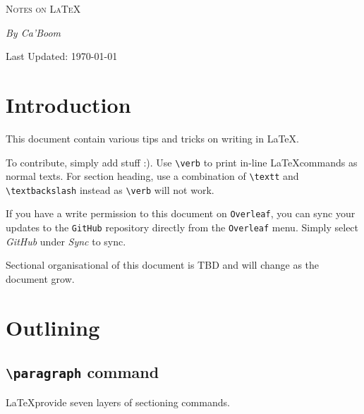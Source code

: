 \documentclass[a4paper,12pt]{article}
\begin{document}
\begin{titlepage}
    \centering
    \vspace*{3cm}  %
    {\scshape \Huge Notes on \LaTeX \par}
    \vspace{6cm}
    {\LARGE \itshape By Ca'Boom \par}
    \vspace{6cm}
    {\Large Last Updated: \today \par}
    \vfill

\end{titlepage}

\section{Introduction}

This document contain various tips and tricks on writing in \LaTeX.

To contribute, simply add stuff :). Use \verb|\verb| to print in-line \LaTeX commands as normal texts. For section heading, use a combination of \verb|\textt| and \verb|\textbackslash| instead as \verb|\verb| will not work.

If you have a write permission to this document on \texttt{Overleaf}, you can sync your updates to the \texttt{GitHub} repository directly from the \texttt{Overleaf} menu. Simply select \emph{GitHub} under \emph{Sync} to sync.

Sectional organisational of this document is TBD and will change as the document grow.

\section{Outlining}

\subsection{\texttt{\textbackslash paragraph} command}
\LaTeX provide seven layers of sectioning commands.
\end{document}
